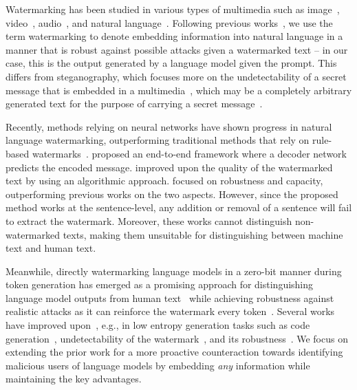 Watermarking has been studied in various types of multimedia such as image~\citep{potdar2005survey}, video~\citep{asikuzzaman2017overview}, audio~\citep{hua2016twenty}, and natural language~\citep{topkara2005natural}.
Following previous works~\citep{zhu2018hidden, luo2020distortion}, we use the term watermarking to denote embedding information into natural language in a manner that is robust against possible attacks given a watermarked text -- in our case, this is the output generated by a language model given the prompt. This differs from steganography, which focuses more on the undetectability of a secret message that is embedded in a multimedia~\citep{cheddad2010digital, tao2014robust}, which may be a completely arbitrary generated text for the purpose of carrying a secret message~\citep{fang2017generating}.  

Recently, methods relying on neural networks have shown progress in natural language watermarking, outperforming traditional methods that rely on rule-based watermarks~\citep{topkara2006hiding, topkara2006natural, atallah2001natural}. \citet{abdelnabi2021adversarial} proposed an end-to-end framework where a decoder network predicts the encoded message. \citet{yang2022tracing} improved upon the quality of the watermarked text by using an algorithmic approach. \citet{yoo2023robust} focused on robustness and capacity, outperforming previous works on the two aspects. However, since the proposed method works at the sentence-level, any addition or removal of a sentence will fail to extract the watermark. Moreover, these works cannot distinguish non-watermarked texts, making them unsuitable for distinguishing between machine text and human text.


Meanwhile, directly watermarking language models in a zero-bit manner during token generation has emerged as a promising approach for distinguishing language model outputs from human text~\citep{kirchenbauer2023watermark, openai-watermark} while achieving robustness against realistic attacks as it can reinforce the watermark every token~\citep{kirchenbauer2023reliability}. Several works have improved upon~\citet{kirchenbauer2023watermark}, e.g., in low entropy generation tasks such as code generation~\citep{lee2023wrote}, undetectability of the watermark~\citep{christ2023undetectable}, and its robustness~\citep{munyer2023deeptextmark}. We focus on extending the prior work for a more proactive counteraction towards identifying malicious users of language models by embedding \textit{any} information while maintaining the key advantages.


